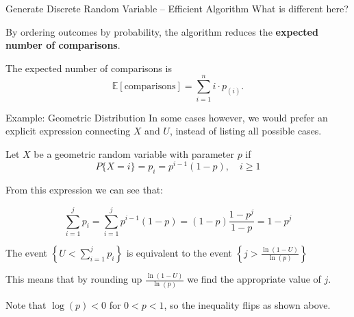 \documentclass[8pt]{beamer}
\begin{document}
\begin{frame}{Generate Discrete Random Variable -- Efficient Algorithm}
What is different here? 

\vspace{2mm}

By ordering outcomes by probability, the algorithm reduces the \textbf{expected number of comparisons}.

\vspace{2mm}

The expected number of comparisons is
\begin{equation*}
	\mathbb{E}[\text{comparisons}] = \sum_{i=1}^{n} i \cdot p_{(i)}.
\end{equation*}
\end{frame}

\begin{frame}{Example: Geometric Distribution}
In some cases however, we would prefer an explicit expression connecting $X$ and $U$, instead of listing all possible cases.

\vspace{1mm} 

Let $X$ be a geometric random variable with parameter $p$ if 
    \begin{equation*}
        P\{X = i\} = p_i = p^{i-1}(1-p), \quad i \geq 1
    \end{equation*}
    
\vspace{1mm}

From this expression we can see that:

\[\sum_{i=1}^j p_i =\sum_{i=1}^j p^{i-1}(1-p)=(1-p)\frac{1-p^j}{1-p}=1-p^j\]

The event $\displaystyle{\left\{ U< \sum_{i=1}^{j} p_i \right\}}$ is equivalent to the event 
$\displaystyle{\left\{ j>\frac{\ln(1-U)}{\ln (p)} \right\}}$

This means that by rounding up $\displaystyle{\frac{\ln(1-U)}{\ln (p)}}$ we find the appropriate value of $j$.

\vspace{1mm}

Note that $\log(p) < 0$ for $0 < p < 1$, so the inequality flips as shown above.
\end{frame}
\end{document}
